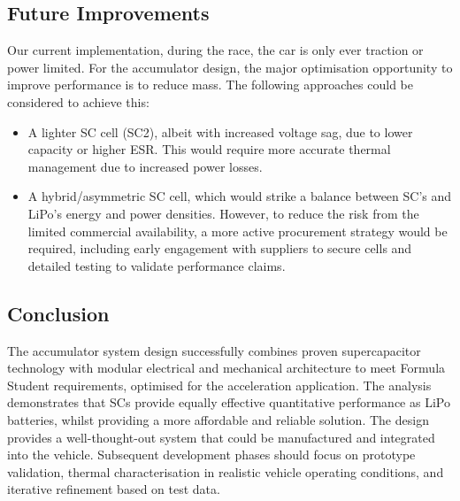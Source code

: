 \subsection{Future Improvements}

Our current implementation, during the race, the car is only ever traction or power limited. For the accumulator design, the major optimisation opportunity to improve performance is to reduce mass. The following approaches could be considered to achieve this:
\begin{itemize}
    \item A lighter SC cell (SC2), albeit with increased voltage sag, due to lower capacity or higher ESR. This would require more accurate thermal management due to increased power losses.
    \item A hybrid/asymmetric SC cell, which would strike a balance between SC's and LiPo's energy and power densities. However, to reduce the risk from the limited commercial availability, a more active procurement strategy would be required, including early engagement with suppliers to secure cells and detailed testing to validate performance claims.
\end{itemize}

\subsection{Conclusion}
The accumulator system design successfully combines proven supercapacitor technology with modular electrical and mechanical architecture to meet Formula Student requirements, optimised for the acceleration application. The analysis demonstrates that SCs provide equally effective quantitative performance as LiPo batteries, whilst providing a more affordable and reliable solution. The design provides a well-thought-out system that could be manufactured and integrated into the vehicle. Subsequent development phases should focus on prototype validation, thermal characterisation in realistic vehicle operating conditions, and iterative refinement based on test data.

\compactbib
